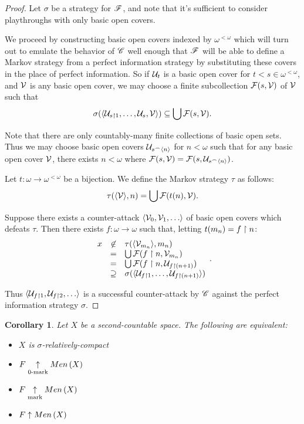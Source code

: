 \documentclass{amsart}
\newtheorem{corollary}[theorem]{Corollary}
\theoremstyle{definition}
\begin{document}
\begin{proof}
  Let \(\sigma\) be a strategy for \(\mathscr{F}\), and note that
  it's sufficient to consider playthroughs with only basic open covers.

  We proceed by constructing basic open covers indexed by \(\omega^{<\omega}\)
  which will turn out to emulate the behavior of \(\mathscr{C}\) well enough
  that \(\mathscr{F}\) will be able to define a Markov strategy from a perfect
  information strategy by substituting
  these covers in the place of perfect information.
  So if \(\mathcal{U}_t\) is a basic open cover for \(t<s\in\omega^{<\omega}\), and
  \(\mathcal{V}\) is any basic open cover, we may choose a finite subcollection
  \(\mathcal{F}(s,\mathcal{V})\) of \(\mathcal{V}\) such that
  \[
    \sigma(\langle\mathcal{U}_{s\restriction 1},\dots,\mathcal{U}_{s},\mathcal{V}\rangle)
      \subseteq
    \bigcup \mathcal{F}(s,\mathcal{V})
  .\]

  Note that there are only countably-many finite collections of basic open sets.
  Thus we may choose basic open covers \(\mathcal{U}_{s{^\frown}\langle n\rangle}\) for \(n<\omega\)
  such that for any basic open cover \(\mathcal{V}\), there exists \(n<\omega\) where
  \(\mathcal{F}(s,\mathcal{V})=\mathcal{F}(s,\mathcal{U}_{s{^\frown}\langle n\rangle})\).

  Let \(t:\omega\to\omega^{<\omega}\) be a bijection. We define the Markov
  strategy \(\tau\) as follows:
  \[
    \tau(\langle\mathcal{V}\rangle, n)
      =
    \bigcup \mathcal{F}(t(n),\mathcal{V})
  .\]

  Suppose there exists a counter-attack \(\<\mc V_0,\mc V_1,\dots\>\) of
  basic open covers which defeats \(\tau\). Then there exists
  \(f:\omega\to\omega\) such that, letting \(t(m_n)=f\restriction n\):
  \[
    \begin{array}{rcl}
    x & \not\in & \tau(\langle\mathcal{V}_{m_n}\rangle,m_n) \\
    & = & \bigcup\mathcal{F}(f\restriction n,\mathcal{V}_{m_n}) \\
    & = & \bigcup\mathcal{F}(f\restriction n,\mathcal{U}_{f\restriction (n+1)}) \\
    & \supseteq & \sigma(\langle\mathcal{U}_{f\restriction 1},\dots,\mathcal{U}_{f\restriction(n+1)}\rangle)
    \end{array}
  .\]

  Thus \(\<\mc U_{f\rest 1}, \mc U_{f\rest 2},\dots\>\) is a successful
  counter-attack by \(\mathscr{C}\) against the perfect information strategy \(\sigma\).
\end{proof}

\begin{corollary}
  Let \(X\) be a second-countable space. The following are equivalent:
  \begin{itemize}
    \item \(X\) is \(\sigma\)-relatively-compact
    \item \(F \underset{0\text{-mark}}{\uparrow} Men\left({X}\right)\)
    \item \(F \underset{\text{mark}}{\uparrow} Men\left({X}\right)\)
    \item \(F \uparrow Men\left({X}\right)\)
  \end{itemize}
\end{corollary}
\end{document}
